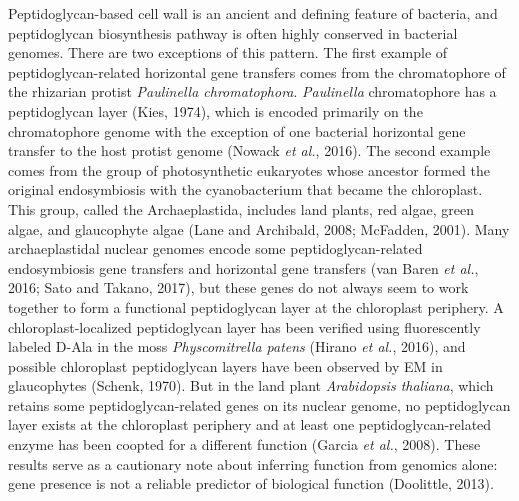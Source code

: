 \documentclass[11pt]{article}
\begin{document}
\begin{sloppypar}
Peptidoglycan-based cell wall is an ancient and defining feature of bacteria, and peptidoglycan biosynthesis pathway is often highly conserved in bacterial genomes. 
There are two exceptions of this pattern. 
The first example of peptidoglycan-related horizontal gene transfers comes from the chromatophore of the rhizarian protist \textit{Paulinella chromatophora}. 
\textit{Paulinella} chromatophore has a peptidoglycan layer (Kies, 1974), which is encoded primarily on the chromatophore genome with the exception of one bacterial horizontal gene transfer to the host protist genome (Nowack \textit{et al.}, 2016). 
The second example comes from the group of photosynthetic eukaryotes whose ancestor formed the original endosymbiosis with the cyanobacterium that became the chloroplast. 
This group, called the Archaeplastida, includes land plants, red algae, green algae, and glaucophyte algae (Lane and Archibald, 2008; McFadden, 2001). 
Many archaeplastidal nuclear genomes encode some peptidoglycan-related endosymbiosis gene transfers and horizontal gene transfers (van Baren \textit{et al.}, 2016; Sato and Takano, 2017), but these genes do not always seem to work together to form a functional peptidoglycan layer at the chloroplast periphery. 
A chloroplast-localized peptidoglycan layer has been verified using fluorescently labeled D-Ala in the moss \textit{Physcomitrella patens} (Hirano \textit{et al.}, 2016), and possible chloroplast peptidoglycan layers have been observed by EM in glaucophytes (Schenk, 1970). 
But in the land plant \textit{Arabidopsis thaliana}, which retains some peptidoglycan-related genes on its nuclear genome, no peptidoglycan layer exists at the chloroplast periphery and at least one peptidoglycan-related enzyme has been coopted for a different function (Garcia \textit{et al.}, 2008). 
These results serve as a cautionary note about inferring function from genomics alone: gene presence is not a reliable predictor of biological function (Doolittle, 2013).

\newline


\end{sloppypar}
\end{document}
